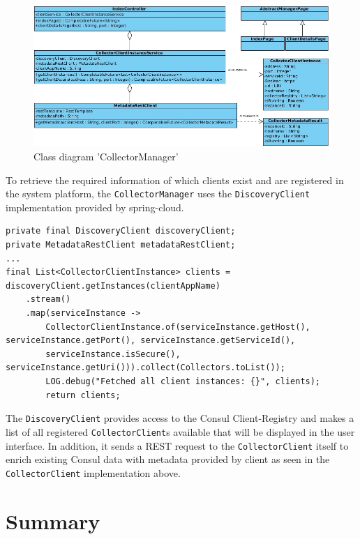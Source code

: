 \begin{figure}[H]
	\centering
	\includegraphics[width=1.0\textwidth]{../uml/class-collector-manager.jpg}
	\caption{Class diagram 'CollectorManager'}
	\label{class-diagram-collector-manager}
\end{figure}

To retrieve the required information of which clients exist and are registered in the system platform, the \verb|CollectorManager|
uses the \verb|DiscoveryClient| implementation provided by spring-cloud.

\begin{lstlisting}[caption={"CollectorClientInstanceService", Get client instances}, captionpos=b, label={lst:client-instance-service}]
private final DiscoveryClient discoveryClient;
private MetadataRestClient metadataRestClient;
...
final List<CollectorClientInstance> clients = discoveryClient.getInstances(clientAppName)
    .stream()
    .map(serviceInstance ->
        CollectorClientInstance.of(serviceInstance.getHost(), serviceInstance.getPort(), serviceInstance.getServiceId(),
        serviceInstance.isSecure(), serviceInstance.getUri())).collect(Collectors.toList());
        LOG.debug("Fetched all client instances: {}", clients);
        return clients;
\end{lstlisting}

The \verb|DiscoveryClient| provides access to the Consul Client-Registry and makes a list of all registered \verb|CollectorClient|s
available that will be displayed in the user interface. In addition, it sends a REST request to the \verb|CollectorClient| itself to enrich
existing Consul data with metadata provided by client as seen in the \verb|CollectorClient| implementation above.

\section{Summary}

